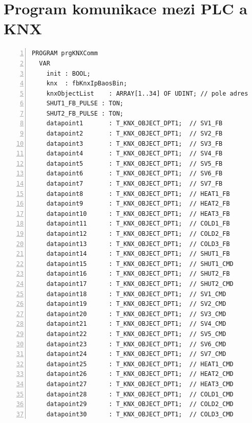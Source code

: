 \chapter{Program komunikace mezi PLC a KNX}
\label{apend:KNXComm}
\begin{lstlisting}[language=ST, breaklines=true, numbers=left, numberstyle=\small, numbersep=10pt, frame=single, basicstyle=\ttfamily\small, caption={Program komunikace mezi PLC a KNX}, label={lst:prgKNXComm}]
  PROGRAM prgKNXComm
  VAR
    init : BOOL;
    knx  : fbKnxIpBaosBin;
    knxObjectList    : ARRAY[1..34] OF UDINT; // pole adres
    SHUT1_FB_PULSE : TON;
    SHUT2_FB_PULSE : TON;
    datapoint1       : T_KNX_OBJECT_DPT1;  // SV1_FB
    datapoint2       : T_KNX_OBJECT_DPT1;  // SV2_FB
    datapoint3       : T_KNX_OBJECT_DPT1;  // SV3_FB
    datapoint4       : T_KNX_OBJECT_DPT1;  // SV4_FB
    datapoint5       : T_KNX_OBJECT_DPT1;  // SV5_FB
    datapoint6       : T_KNX_OBJECT_DPT1;  // SV6_FB
    datapoint7       : T_KNX_OBJECT_DPT1;  // SV7_FB
    datapoint8       : T_KNX_OBJECT_DPT1;  // HEAT1_FB
    datapoint9       : T_KNX_OBJECT_DPT1;  // HEAT2_FB
    datapoint10      : T_KNX_OBJECT_DPT1;  // HEAT3_FB
    datapoint11      : T_KNX_OBJECT_DPT1;  // COLD1_FB
    datapoint12      : T_KNX_OBJECT_DPT1;  // COLD2_FB
    datapoint13      : T_KNX_OBJECT_DPT1;  // COLD3_FB
    datapoint14      : T_KNX_OBJECT_DPT1;  // SHUT1_FB
    datapoint15      : T_KNX_OBJECT_DPT1;  // SHUT1_CMD
    datapoint16      : T_KNX_OBJECT_DPT1;  // SHUT2_FB
    datapoint17      : T_KNX_OBJECT_DPT1;  // SHUT2_CMD
    datapoint18      : T_KNX_OBJECT_DPT1;  // SV1_CMD
    datapoint19      : T_KNX_OBJECT_DPT1;  // SV2_CMD
    datapoint20      : T_KNX_OBJECT_DPT1;  // SV3_CMD
    datapoint21      : T_KNX_OBJECT_DPT1;  // SV4_CMD
    datapoint22      : T_KNX_OBJECT_DPT1;  // SV5_CMD
    datapoint23      : T_KNX_OBJECT_DPT1;  // SV6_CMD
    datapoint24      : T_KNX_OBJECT_DPT1;  // SV7_CMD
    datapoint25      : T_KNX_OBJECT_DPT1;  // HEAT1_CMD
    datapoint26      : T_KNX_OBJECT_DPT1;  // HEAT2_CMD
    datapoint27      : T_KNX_OBJECT_DPT1;  // HEAT3_CMD
    datapoint28      : T_KNX_OBJECT_DPT1;  // COLD1_CMD
    datapoint29      : T_KNX_OBJECT_DPT1;  // COLD2_CMD
    datapoint30      : T_KNX_OBJECT_DPT1;  // COLD3_CMD
\end{lstlisting}
\pagebreak
